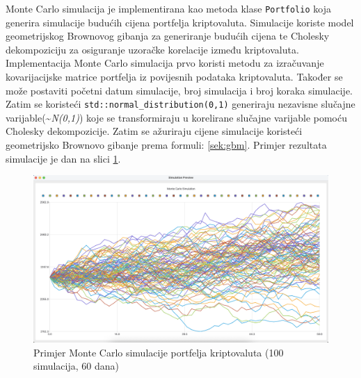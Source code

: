 \documentclass[zavrsnirad]{fer}
\begin{document}
Monte Carlo simulacija je implementirana kao metoda klase
\texttt{Portfolio} koja generira simulacije budućih cijena portfelja
kriptovaluta. Simulacije koriste model geometrijskog Brownovog gibanja
za generiranje budućih cijena te Cholesky dekompoziciju za
osiguranje uzoračke korelacije između kriptovaluta.
Implementacija Monte Carlo simulacija prvo koristi metodu za izračuvanje
kovarijacijske matrice portfelja iz povijesnih podataka kriptovaluta.
Također se može postaviti početni datum simulacije, broj simulacija i
broj koraka simulacije.
Zatim se koristeći \texttt{std::normal\_distribution(0,1)} generiraju
nezavisne slučajne varijable(\textasciitilde \textit{N(0,1)}) koje se
transformiraju u korelirane slučajne varijable pomoću Cholesky dekompozicije.
Zatim se ažuriraju cijene simulacije koristeći geometrijsko Brownovo gibanje
prema formuli:
\ref{sek:gbm}. Primjer rezultata simulacije je dan na slici
\ref{fig:monte_carlo_example}.
\begin{figure}[H]
    \centering
    \includegraphics[width=1.0\textwidth]{Figures/monte_carlo_example.png}
    \caption{Primjer Monte Carlo simulacije portfelja kriptovaluta (100
    simulacija, 60 dana)}
    \label{fig:monte_carlo_example}
\end{figure}
\end{document}

